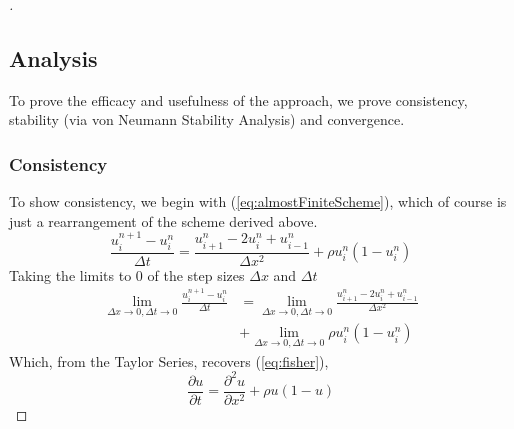 \documentclass[a4paper]{article}
\begin{document}
\begin{proof}[]
	\subsection{Analysis}\label{sec:FDanalysis}
	To prove the efficacy and usefulness of the approach, we prove consistency, stability (via von Neumann Stability Analysis) and convergence.
	\subsubsection{Consistency}
	To show consistency, we begin with (\ref{eq:almostFiniteScheme}), which of course is just a rearrangement of the scheme derived above.
	\begin{equation*}
		    \frac{u_{i}^{n+1}-u_{i}^{n}}{\Delta t} = \frac{u_{i+1}^{n}-2u_{i}^{n}+u_{i-1}^{n}}{\Delta x^2} + \rho u_{i}^{n}(1-u_{i}^{n})
	\end{equation*}
	Taking the limits to 0 of the step sizes $\Delta x$ and $\Delta t$
	\begin{equation*}
	\begin{split}
	    \lim_{\Delta x\to0,\Delta t\to0}\frac{u_{i}^{n+1}-u_{i}^{n}}{\Delta t} & = \lim_{\Delta x\to0,\Delta t\to0}\frac{u_{i+1}^{n}-2u_{i}^{n}+u_{i-1}^{n}}{\Delta x^2}\\ 
	    & + \lim_{\Delta x\to0,\Delta t\to0}\rho u_{i}^{n}(1-u_{i}^{n})
	\end{split}
	\end{equation*}
	Which, from the Taylor Series, recovers (\ref{eq:fisher}),
	\begin{equation*}
		    \frac{\partial u}{\partial t} = \frac{\partial^2 u}{\partial x^2} + \rho u(1-u)
		\end{equation*}
	\end{proof}
\end{document}
